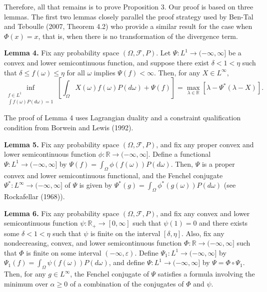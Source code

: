 \documentclass[12pt,a4paper]{article}
\newenvironment{original}
  {\par\noindent\color{black}\smallskip}
  {\par\smallskip}
\begin{document}
\begin{original}
Therefore, all that remains is to prove Proposition 3. Our proof is based on three lemmas. The first two lemmas closely parallel the proof strategy used by Ben-Tal and Teboulle (2007, Theorem 4.2) who provide a similar result for the case when $\Phi(x) = x$, that is, when there is no transformation of the divergence term.

\textbf{Lemma 4.} Fix any probability space $(\Omega, \mathcal{F}, P)$. Let $\Psi: L^1 \to (-\infty, \infty]$ be a convex and lower semicontinuous function, and suppose there exist $\delta < 1 < \eta$ such that $\delta \leq f(\omega) \leq \eta$ for all $\omega$ implies $\Psi(f) < \infty$. Then, for any $X \in L^\infty$,
\[
\inf_{\substack{f \in L^1 \\ \int f(\omega) P(d\omega) = 1}} \left[ \int_\Omega X(\omega) f(\omega) P(d\omega) + \Psi(f) \right] = \max_{\lambda \in \mathbb{R}} \left[ \lambda - \Psi^*( \lambda - X ) \right].
\]

The proof of Lemma 4 uses Lagrangian duality and a constraint qualification condition from Borwein and Lewis (1992).

\textbf{Lemma 5.} Fix any probability space $(\Omega, \mathcal{F}, P)$, and fix any proper convex and lower semicontinuous function $\phi: \mathbb{R} \to (-\infty, \infty]$. Define a functional $\Psi: L^1 \to (-\infty, \infty]$ by $\Psi(f) = \int_\Omega \phi(f(\omega)) P(d\omega)$. Then, $\Psi$ is a proper convex and lower semicontinuous functional, and the Fenchel conjugate $\Psi^*: L^\infty \to (-\infty, \infty]$ of $\Psi$ is given by $\Psi^*(g) = \int_\Omega \phi^*(g(\omega)) P(d\omega)$ (see Rockafellar (1968)).

\textbf{Lemma 6.} Fix any probability space $(\Omega, \mathcal{F}, P)$, and fix any convex and lower semicontinuous function $\psi: \mathbb{R}_+ \to [0, \infty]$ such that $\psi(1) = 0$ and there exists some $\delta < 1 < \eta$ such that $\psi$ is finite on the interval $[\delta, \eta]$. Also, fix any nondecreasing, convex, and lower semicontinuous function $\Phi: \mathbb{R} \to (-\infty, \infty]$ such that $\Phi$ is finite on some interval $(-\infty, \varepsilon)$. Define $\Psi_1: L^1 \to (-\infty, \infty]$ by $\Psi_1(f) = \int_\Omega \psi(f(\omega)) P(d\omega)$, and define $\Psi: L^1 \to (-\infty, \infty]$ by $\Psi = \Phi \circ \Psi_1$. Then, for any $g \in L^\infty$, the Fenchel conjugate of $\Psi$ satisfies a formula involving the minimum over $\alpha \geq 0$ of a combination of the conjugates of $\Phi$ and $\psi$.


\end{original}
\end{document}
